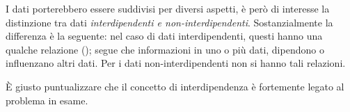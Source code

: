 \documentclass{subfiles}
\begin{document}
I dati porterebbero essere suddivisi per diversi aspetti, è però di interesse la distinzione tra dati \emph{interdipendenti \emph{e} non-interdipendenti}.
Sostanzialmente la differenza è la seguente: nel caso di dati interdipendenti, questi hanno una qualche relazione  ();
segue che informazioni in uno o più dati, dipendono o influenzano altri dati. Per i dati non-interdipendenti non si hanno tali relazioni.

\begin{Remark*}
    \`E giusto puntualizzare che il concetto di interdipendenza è fortemente legato al problema in esame.
\end{Remark*}
\end{document}
